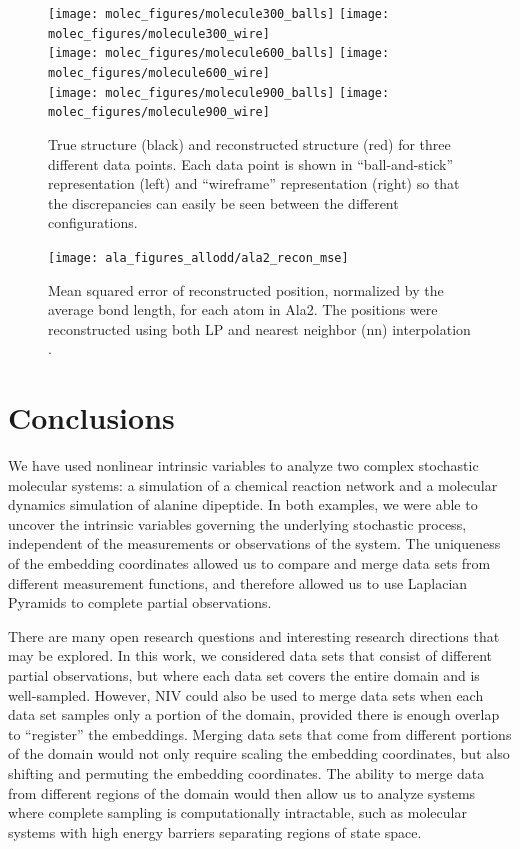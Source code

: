 \documentclass[aip,jcp,preprint]{revtex4-1}
\begin{document}
\begin{figure}[ht]
    \centering
    \texttt{[image: molec\_figures/molecule300\_balls]}
    \texttt{[image: molec\_figures/molecule300\_wire]}\\
    \texttt{[image: molec\_figures/molecule600\_balls]}
    \texttt{[image: molec\_figures/molecule600\_wire]}\\
    \texttt{[image: molec\_figures/molecule900\_balls]}
    \texttt{[image: molec\_figures/molecule900\_wire]}
    \caption{True structure (black) and reconstructed structure (red) for three different data points. Each data point is shown in ``ball-and-stick'' representation (left) and ``wireframe'' representation (right) so that the discrepancies can easily be seen between the different configurations.}
    \label{fig:ala_molecules}
\end{figure}

\begin{figure}
    \texttt{[image: ala\_figures\_allodd/ala2\_recon\_mse]}
    \caption{Mean squared error of reconstructed position, normalized by the average bond length, for each atom in Ala2.
    The positions were reconstructed using both LP and nearest neighbor (nn) interpolation .}
    \label{fig:ala_mse}
\end{figure}

\section{Conclusions} \label{sec:conclusions}
We have used nonlinear intrinsic variables to analyze two complex stochastic molecular systems: a simulation of a chemical reaction network and a molecular dynamics simulation of alanine dipeptide.
%
In both examples, we were able to uncover the intrinsic variables governing the underlying stochastic process, independent of the measurements or observations of the system.
%
The uniqueness of the embedding coordinates allowed us to compare and merge data sets from different measurement functions, and therefore allowed us to use Laplacian Pyramids to complete partial observations.

There are many open research questions and interesting research directions that may be explored.
%
In this work, we considered data sets that consist of different partial observations, but where each data set covers the entire domain and is well-sampled.
%
However, NIV could also be used to merge data sets when each data set samples only a portion of the domain, provided there is enough overlap to ``register'' the embeddings.
%
Merging data sets that come from different portions of the domain would not only require scaling the embedding coordinates,
but also shifting and permuting the embedding coordinates.
%
The ability to merge data from different regions of the domain would then allow us to analyze systems where complete sampling is computationally intractable, such as molecular systems with high energy barriers separating regions of state space.
\end{document}

